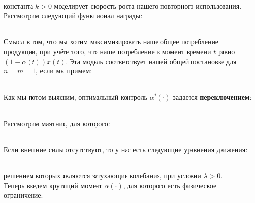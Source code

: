\

константа $k > 0$ моделирует скорость роста нашего повторного использования. Рассмотрим следующий функционал награды: \\

\

Смысл в том, что мы хотим максимизировать наше общее потребление продукции, при учёте того, что наше потребление в момент времени $t$ равно $(1 - \alpha(t))x(t)$. Эта модель соответствует нашей общей постановке для $n = m = 1$, если мы примем: \\

\

Как мы потом выясним, оптимальный контроль $\alpha^*(\cdot)$ задается \textbf{переключением}: \\

\


Рассмотрим маятник, для которого: \\

\

Если внешние силы отсутствуют, то у нас есть следующие уравнения движения: \\

\

решением которых являются затухающие колебания, при условии $\lambda > 0$. \\

Теперь введем крутящий момент $\alpha(\cdot)$, для которого есть физическое ограничение: \\

